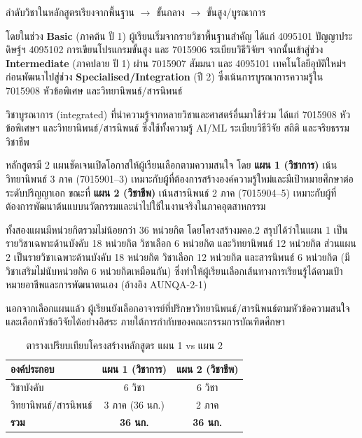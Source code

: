 
ลำดับวิชาในหลักสูตรเรียงจากพื้นฐาน $\rightarrow$ ขั้นกลาง $\rightarrow$ ขั้นสูง/บูรณาการ

โดยในช่วง \textbf{Basic} (ภาคต้น ปี 1) ผู้เรียนเริ่มจากรายวิชาพื้นฐานสำคัญ ได้แก่ 4095101 ปัญญาประดิษฐ์ฯ 4095102 การเขียนโปรแกรมขั้นสูง และ 7015906 ระเบียบวิธีวิจัยฯ จากนั้นเข้าสู่ช่วง \textbf{Intermediate} (ภาคปลาย ปี 1) ผ่าน 7015907 สัมมนา และ 4095101 เทคโนโลยีอุบัติใหม่ฯ ก่อนพัฒนาไปสู่ช่วง \textbf{Specialised/Integration} (ปี 2) ซึ่งเน้นการบูรณาการความรู้ใน 7015908 หัวข้อพิเศษ และวิทยานิพนธ์/สารนิพนธ์

วิชาบูรณาการ (integrated) ที่นำความรู้จากหลายวิชาและศาสตร์อื่นมาใช้ร่วม ได้แก่ 7015908 หัวข้อพิเศษฯ และวิทยานิพนธ์/สารนิพนธ์ ซึ่งใช้ทั้งความรู้ AI/ML ระเบียบวิธีวิจัย สถิติ และจริยธรรมวิชาชีพ


หลักสูตรมี 2 แผนชัดเจนเปิดโอกาสให้ผู้เรียนเลือกตามความสนใจ
โดย \textbf{แผน 1 (วิชาการ)} เน้นวิทยานิพนธ์ 3 ภาค (7015901--3) เหมาะกับผู้ที่ต้องการสร้างองค์ความรู้ใหม่และมีเป้าหมายศึกษาต่อระดับปริญญาเอก ขณะที่ \textbf{แผน 2 (วิชาชีพ)} เน้นสารนิพนธ์ 2 ภาค (7015904--5) เหมาะกับผู้ที่ต้องการพัฒนาต้นแบบนวัตกรรมและนำไปใช้ในงานจริงในภาคอุตสาหกรรม

ทั้งสองแผนมีหน่วยกิตรวมไม่น้อยกว่า 36 หน่วยกิต โดยโครงสร้างมคอ.2 สรุปได้ว่าในแผน 1 เป็นรายวิชาเฉพาะด้านบังคับ 18 หน่วยกิต วิชาเลือก 6 หน่วยกิต และวิทยานิพนธ์ 12 หน่วยกิต ส่วนแผน 2 เป็นรายวิชาเฉพาะด้านบังคับ 18 หน่วยกิต วิชาเลือก 12 หน่วยกิต และสารนิพนธ์ 6 หน่วยกิต (มีวิชาเสริมไม่นับหน่วยกิต 6 หน่วยกิตเหมือนกัน) ซึ่งทำให้ผู้เรียนเลือกเส้นทางการเรียนรู้ได้ตามเป้าหมายอาชีพและการพัฒนาตนเอง (อ้างอิง AUNQA-2-1)

นอกจากเลือกแผนแล้ว ผู้เรียนยังเลือกอาจารย์ที่ปรึกษาวิทยานิพนธ์/สารนิพนธ์ตามหัวข้อความสนใจ และเลือกหัวข้อวิจัยได้อย่างอิสระ ภายใต้การกำกับของคณะกรรมการบัณฑิตศึกษา

\begin{table}[H]
  \centering
  \caption{ตารางเปรียบเทียบโครงสร้างหลักสูตร แผน 1 vs แผน 2}
  \begin{tabularx}{\linewidth}{|>{\raggedright\arraybackslash}X|c|c|}
    \hline
    \textbf{องค์ประกอบ} & \textbf{แผน 1 (วิชาการ)} & \textbf{แผน 2 (วิชาชีพ)} \\
    \hline
    วิชาบังคับ                     & 6 วิชา & 6 วิชา \\
    วิทยานิพนธ์/สารนิพนธ์           & 3 ภาค (36 นก.) & 2 ภาค \\
    \textbf{รวม}                   & \textbf{36 นก.} & \textbf{36 นก.} \\
    \hline
  \end{tabularx}
\end{table}


